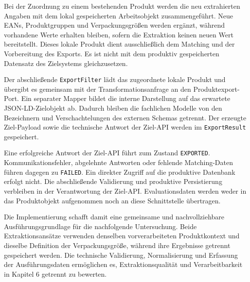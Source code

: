 Bei der Zuordnung zu einem bestehenden Produkt werden die neu extrahierten Angaben mit dem lokal gespeicherten Arbeitsobjekt zusammengeführt. Neue EANs, 
Produktgruppen und Verpackungsgrößen werden ergänzt, während vorhandene Werte erhalten bleiben, sofern die Extraktion keinen neuen Wert bereitstellt. Dieses 
lokale Produkt dient ausschließlich dem Matching und der Vorbereitung des Exports. Es ist nicht mit dem produktiv gespeicherten Datensatz des Zielsystems gleichzusetzen.

Der abschließende \texttt{ExportFilter} lädt das zugeordnete lokale Produkt und übergibt es gemeinsam mit der Transformationsanfrage an den Produktexport-Port. 
Ein separater Mapper bildet die interne Darstellung auf das erwartete JSON-LD-Zielobjekt ab. Dadurch bleiben die fachlichen Modelle von den Bezeichnern und 
Verschachtelungen des externen Schemas getrennt. Der erzeugte Ziel-Payload sowie die technische Antwort der Ziel-API werden im \texttt{ExportResult} gespeichert.

Eine erfolgreiche Antwort der Ziel-API führt zum Zustand \texttt{EXPORTED}. Kommunikationsfehler, abgelehnte Antworten oder fehlende Matching-Daten führen 
dagegen zu \texttt{FAILED}. Ein direkter Zugriff auf die produktive Datenbank erfolgt nicht. Die abschließende Validierung und produktive Persistierung verbleiben 
in der Verantwortung der Ziel-API. Evaluationsdaten werden weder in das Produktobjekt aufgenommen noch an diese Schnittstelle übertragen.

Die Implementierung schafft damit eine gemeinsame und nachvollziehbare Ausführungsgrundlage für die nachfolgende Untersuchung. Beide Extraktionsansätze verwenden 
denselben vorverarbeiteten Produktkontext und dieselbe Definition der Verpackungsgröße, während ihre Ergebnisse getrennt gespeichert werden. Die technische 
Validierung, Normalisierung und Erfassung der Ausführungsdaten ermöglichen es, Extraktionsqualität und Verarbeitbarkeit in Kapitel 6 getrennt zu bewerten.